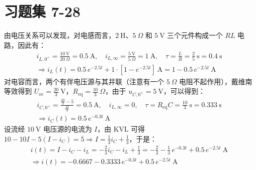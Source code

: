 \documentclass[UTF8]{report}
\theoremstyle{MyLineTheoremStyle} %
\theoremstyle{MyBlockTheoremStyle} %
\theoremstyle{MySubsubsectionStyle} %
\begin{document}
\section{习题集 7-28}
由电压关系可以发现，对电感而言，$2 \ \mathrm{H}$、$5 \ \Omega$ 和 $5 \ \mathrm{V}$ 三个元件构成一个 $RL$ 电路，因此有：
\begin{gather}
    i_{L,0^+} = \frac{10 \ \mathrm{V}}{20 \ \Omega} = 0.5 \ \mathrm{A},\quad i_{L,\infty} = \frac{5 \ \mathrm{V}}{5 \ \Omega} = 1 \ \mathrm{A},\quad \tau = \frac{L}{R} = \frac{2}{5} \ \mathrm{s} =  0.4 \ \mathrm{s} \\ 
    \Longrightarrow 
    i_L(t) = 0.5\, e^{ - 2.5 t} + 1\cdot \left[1 - e^{ - 2.5 t}\right] \ \mathrm{A} = 1 - 0.5 \,e^{ - 2.5 t} \ \mathrm{A}
\end{gather}
对电容而言，两个有伴电压源与其并联（注意有一个 $5 \ \Omega$ 电阻不起作用），戴维南等效得到 $U_{\text{oc}} = \frac{20}{3} \ \mathrm{V}$，$R_{\text{eq}} = \frac{10}{3} \ \Omega$，由于 $u_{C,0^+} = 5 \ \mathrm{V}$，可以得到：
\begin{gather}
    i_{C,0^+} = \frac{\frac{20}{3} - 5}{\frac{10}{3}} = 0.5 \ \mathrm{A}
    ,\quad 
    i_{L,\infty} = 0
    ,\quad 
    \tau = R_{\text{eq}}C = \frac{10}{3} \ \mathrm{s} =  0.333 \ \mathrm{s} \\ 
    \Longrightarrow 
    i_C(t) = 0.5 \,e^{ -0.3t} \ \mathrm{A}
\end{gather}
设流经 $10 \ \mathrm{V}$ 电压源的电流为 $I$，由 KVL 可得 $10 - 10 I - 5(I - i_C) = 5 \Longrightarrow I = \frac{1}{3}i_C + \frac{1}{3}$，于是：
\begin{gather}
i(t) = I - i_C - i_L = -\frac{2}{3}i_C - i_L + \frac{1}{3} = 
- \frac{2}{3} - \frac{1}{3}\,e^{-0.3 t} + 0.5\,e^{-2.5 t} \ \mathrm{A}\\ 
\Longrightarrow 
\boxed{
    i(t) = -0.6667 - 0.3333\,e^{-0.3 t} + 0.5\,e^{-2.5 t} \ \mathrm{A}
}
\end{gather}
\end{document}
